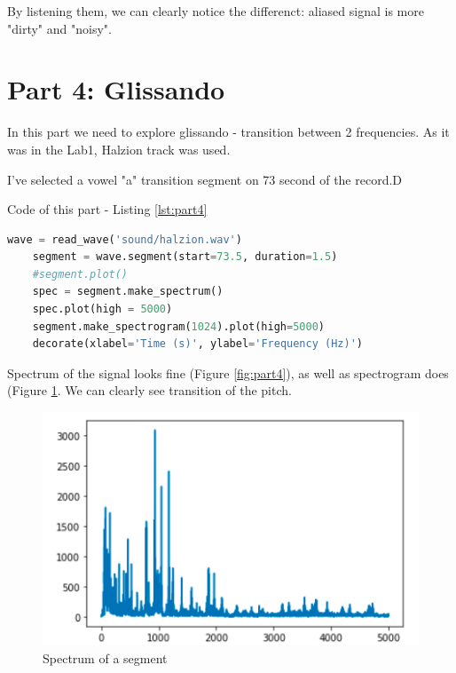 \documentclass[a4paper]{article}
\begin{document}
        By listening them, we can clearly notice the differenct: aliased signal is more "dirty" and "noisy".
            
    \newpage
        \section{Part 4: Glissando}
        
            In this part we need to explore glissando - transition between 2 frequencies. As it was in the Lab1, Halzion track was used.
            
            I've selected a vowel "a" transition segment on 73 second of the record.D
            
            Code of this part - Listing \ref{lst:part4}
            
            \begin{lstlisting}[language=Python,caption=HS operations,label={lst:part4}]
    wave = read_wave('sound/halzion.wav')
    segment = wave.segment(start=73.5, duration=1.5)
    #segment.plot()
    spec = segment.make_spectrum()
    spec.plot(high = 5000)
    segment.make_spectrogram(1024).plot(high=5000)
    decorate(xlabel='Time (s)', ylabel='Frequency (Hz)')
            \end{lstlisting}
            
            Spectrum of the signal looks fine (Figure \ref{fig:part4}), as well as spectrogram does (Figure \ref{fig:part42}. We can clearly see transition of the pitch.
            
            \begin{figure}[H]
                \centering
                \includegraphics[width=\textwidth]{img/yoasobi_spec.png}
                \caption{Spectrum of a segment}
                \label{fig:part42}
            \end{figure}
            
\end{document}

